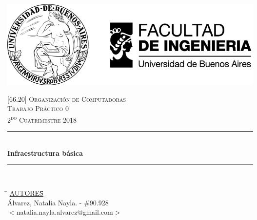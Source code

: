 

\pagestyle{fancy}
\begin{titlepage}
	\newcommand{\HRule}{\rule{\linewidth}{0.5mm}} %
	\center %

	\thispagestyle{empty}
	\begin{center}
		\includegraphics[scale=1]{includes/banner_fiuba.pdf}\\
	\end{center}


	\textsc{\LARGE \textsc{[66.20] Organización de Computadoras}}\\[1cm]
	\textsc{\Large \textsc{Trabajo Práctico 0}}\\[0.5cm]
	\textsc{\large 2\textsuperscript{do} Cuatrimestre 2018}\\[0.5cm]

	\HRule\\[0.5cm]
	{\huge\bfseries Infraestructura básica}\\[0.2cm]
	\HRule\\[0.5cm]

	\begin{tabbing}
		\hspace{2cm}\=\+
		\underline{AUTORES}\hspace{-1cm}\=\+\hspace{1cm}\=\hspace{6cm}\=\\[0.2cm]

    Álvarez, Natalia Nayla.	\>\>- \#90.928\\
		\>\footnotesize{$<$natalia.nayla.alvarez@gmail.com$>$}\\


\end{tabbing}
\end{titlepage}
